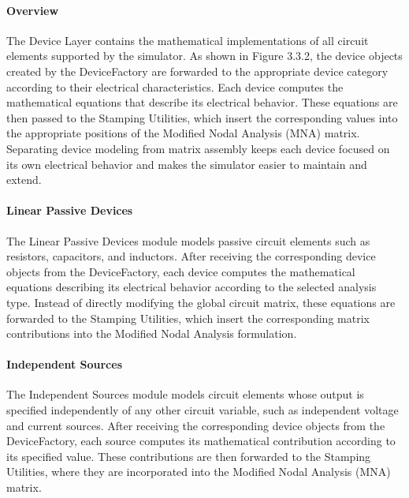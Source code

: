\paragraph{Overview}
The Device Layer contains the mathematical implementations of all circuit elements supported by the simulator. As shown in Figure 3.3.2, the device objects created by the DeviceFactory are forwarded to the appropriate device category according to their electrical characteristics.
Each device computes the mathematical equations that describe its electrical behavior. These equations are then passed to the Stamping Utilities, which insert the corresponding values into the appropriate positions of the Modified Nodal Analysis (MNA) matrix. Separating device modeling from matrix assembly keeps each device focused on its own electrical behavior and makes the simulator easier to maintain and extend.
\paragraph{Linear Passive Devices}
The Linear Passive Devices module models passive circuit elements such as resistors, capacitors, and inductors. After receiving the corresponding device objects from the DeviceFactory, each device computes the mathematical equations describing its electrical behavior according to the selected analysis type. Instead of directly modifying the global circuit matrix, these equations are forwarded to the Stamping Utilities, which insert the corresponding matrix contributions into the Modified Nodal Analysis formulation.
\paragraph{Independent Sources}
The Independent Sources module models circuit elements whose output is specified independently of any other circuit variable, such as independent voltage and current sources. After receiving the corresponding device objects from the DeviceFactory, each source computes its mathematical contribution according to its specified value. These contributions are then forwarded to the Stamping Utilities, where they are incorporated into the Modified Nodal Analysis (MNA) matrix.
